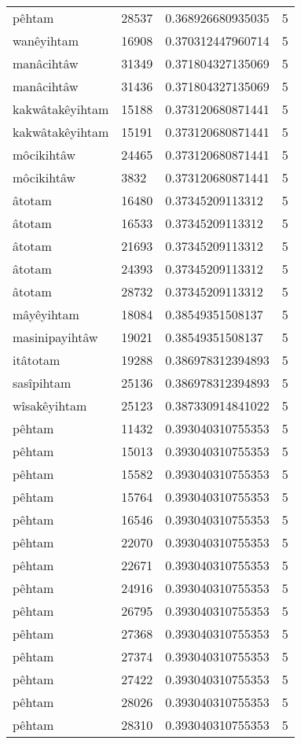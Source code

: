 \begin{longtable}{llll}
pêhtam & 28537 & 0.368926680935035 & 5 \\
wanêyihtam & 16908 & 0.370312447960714 & 5 \\
manâcihtâw & 31349 & 0.371804327135069 & 5 \\
manâcihtâw & 31436 & 0.371804327135069 & 5 \\
kakwâtakêyihtam & 15188 & 0.373120680871441 & 5 \\
kakwâtakêyihtam & 15191 & 0.373120680871441 & 5 \\
môcikihtâw & 24465 & 0.373120680871441 & 5 \\
môcikihtâw & 3832 & 0.373120680871441 & 5 \\
âtotam & 16480 & 0.37345209113312 & 5 \\
âtotam & 16533 & 0.37345209113312 & 5 \\
âtotam & 21693 & 0.37345209113312 & 5 \\
âtotam & 24393 & 0.37345209113312 & 5 \\
âtotam & 28732 & 0.37345209113312 & 5 \\
mâyêyihtam & 18084 & 0.38549351508137 & 5 \\
masinipayihtâw & 19021 & 0.38549351508137 & 5 \\
itâtotam & 19288 & 0.386978312394893 & 5 \\
sasîpihtam & 25136 & 0.386978312394893 & 5 \\
wîsakêyihtam & 25123 & 0.387330914841022 & 5 \\
pêhtam & 11432 & 0.393040310755353 & 5 \\
pêhtam & 15013 & 0.393040310755353 & 5 \\
pêhtam & 15582 & 0.393040310755353 & 5 \\
pêhtam & 15764 & 0.393040310755353 & 5 \\
pêhtam & 16546 & 0.393040310755353 & 5 \\
pêhtam & 22070 & 0.393040310755353 & 5 \\
pêhtam & 22671 & 0.393040310755353 & 5 \\
pêhtam & 24916 & 0.393040310755353 & 5 \\
pêhtam & 26795 & 0.393040310755353 & 5 \\
pêhtam & 27368 & 0.393040310755353 & 5 \\
pêhtam & 27374 & 0.393040310755353 & 5 \\
pêhtam & 27422 & 0.393040310755353 & 5 \\
pêhtam & 28026 & 0.393040310755353 & 5 \\
pêhtam & 28310 & 0.393040310755353 & 5 \\

\end{longtable}
